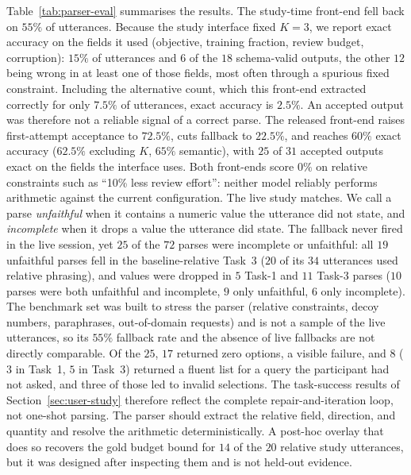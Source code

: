 \documentclass[final,5p,times,twocolumn]{elsarticle}
\begin{document}
Table~\ref{tab:parser-eval} summarises the results. The study-time
front-end fell back on $55\%$ of utterances. Because the study
interface fixed $K = 3$, we report exact accuracy on the fields it
used (objective, training fraction, review budget, corruption): $15\%$
of utterances and $6$ of the $18$ schema-valid outputs, the other $12$
being wrong in at least one of those fields, most often through a spurious fixed constraint. Including the alternative count, which this
front-end extracted correctly for only $7.5\%$ of utterances, exact
accuracy is $2.5\%$. An accepted output was therefore not a reliable
signal of a correct parse. The released front-end raises first-attempt
acceptance to $72.5\%$, cuts fallback to $22.5\%$, and reaches $60\%$
exact accuracy ($62.5\%$ excluding $K$, $65\%$ semantic), with $25$ of
$31$ accepted outputs exact on the fields the interface uses. Both
front-ends score $0\%$ on relative constraints such as ``10\% less
review effort'': neither model reliably performs arithmetic against the
current configuration. The live study matches. We call a parse \emph{unfaithful} when it
contains a numeric value the utterance did not state, and
\emph{incomplete} when it drops a value the utterance did state. The fallback never fired in the live session, yet $25$ of the $72$ parses were incomplete or unfaithful: all $19$ unfaithful parses fell in the baseline-relative Task~3 ($20$ of its $34$ utterances used relative phrasing), and values were dropped in $5$ Task-1 and $11$ Task-3 parses ($10$ parses were both unfaithful and incomplete, $9$ only unfaithful, $6$ only incomplete). The benchmark set was built to stress the parser (relative constraints, decoy numbers, paraphrases, out-of-domain requests) and is not a sample of the live utterances, so its $55\%$ fallback rate and the absence of live fallbacks are not directly comparable. Of the $25$, $17$ returned zero options, a visible failure, and $8$ ($3$ in Task~1, $5$ in Task~3) returned a fluent list for a query the participant had not asked, and three of those led to invalid selections. The
task-success results of Section~\ref{sec:user-study} therefore reflect
the complete repair-and-iteration loop, not one-shot parsing. The
parser should extract the relative field, direction, and quantity and
resolve the arithmetic deterministically. A post-hoc overlay that does
so recovers the gold budget bound for $14$ of the $20$ relative study
utterances, but it was designed after inspecting them and is not
held-out evidence.
\end{document}

